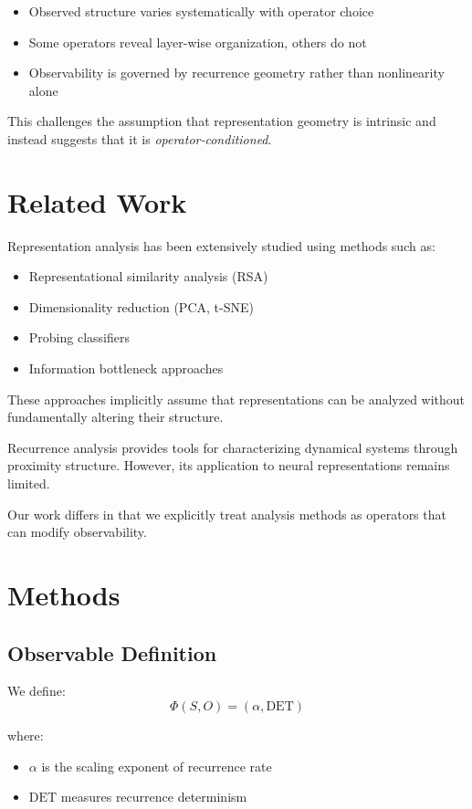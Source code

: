 \documentclass[11pt]{article}
\begin{document}
\begin{itemize}
	\item Observed structure varies systematically with operator choice
	\item Some operators reveal layer-wise organization, others do not
	\item Observability is governed by recurrence geometry rather than nonlinearity alone
\end{itemize}

This challenges the assumption that representation geometry is intrinsic and instead suggests that it is \textit{operator-conditioned}.

\section{Related Work}

Representation analysis has been extensively studied using methods such as:

\begin{itemize}
	\item Representational similarity analysis (RSA)
	\item Dimensionality reduction (PCA, t-SNE)
	\item Probing classifiers
	\item Information bottleneck approaches
\end{itemize}

These approaches implicitly assume that representations can be analyzed without fundamentally altering their structure.

Recurrence analysis \citep{eckmann1987, marwan2007} provides tools for characterizing dynamical systems through proximity structure. However, its application to neural representations remains limited.

Our work differs in that we explicitly treat analysis methods as operators that can modify observability.

\section{Methods}

\subsection{Observable Definition}

We define:
\[
	\Phi(S,O) = (\alpha, \mathrm{DET})
\]

where:
\begin{itemize}
	\item $\alpha$ is the scaling exponent of recurrence rate
	\item $\mathrm{DET}$ measures recurrence determinism
\end{itemize}
\end{document}
